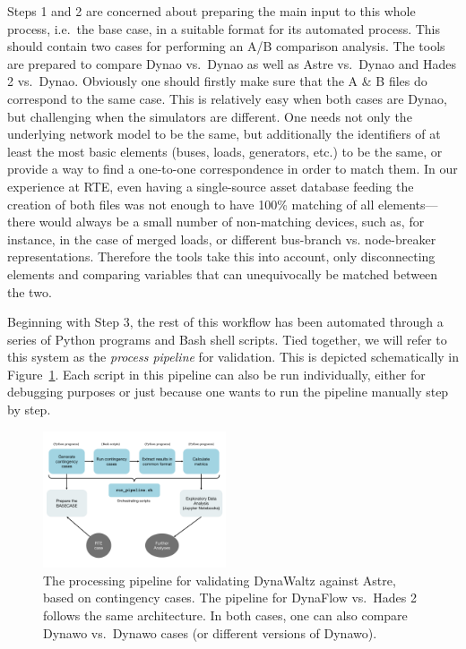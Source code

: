 \documentclass[conference]{IEEEtran}
\newcommand{\Dynawo}{Dyna\textomega o\xspace} %
\begin{document}
Steps 1 and 2 are concerned about preparing the main input to this
whole process, i.e.~the base case, in a suitable format for its
automated process. This should contain two cases for performing an A/B
comparison analysis. The tools are prepared to compare \Dynawo
vs.\ \Dynawo as well as Astre vs.\ \Dynawo and Hades 2
vs.\ \Dynawo. Obviously one should firstly make sure that the A \& B
files do correspond to the same case. This is relatively easy when
both cases are \Dynawo, but challenging when the simulators are
different.  One needs not only the underlying network model to be the
same, but additionally the identifiers of at least the most basic
elements (buses, loads, generators, etc.) to be the same, or provide a
way to find a one-to-one correspondence in order to match them.  In
our experience at RTE, even having a single-source asset database
feeding the creation of both files was not enough to have 100\%
matching of all elements---there would always be a small number of
non-matching devices, such as, for instance, in the case of merged
loads, or different bus-branch vs. node-breaker
representations. Therefore the tools take this into account, only
disconnecting elements and comparing variables that can unequivocally
be matched between the two.

Beginning with Step 3, the rest of this workflow has been automated
through a series of Python programs and Bash shell scripts. Tied
together, we will refer to this system as the \emph{process pipeline}
for validation. This is depicted schematically in
Figure~\ref{fig:pipeline1}. Each script in this pipeline can also be
run individually, either for debugging purposes or just because one
wants to run the pipeline manually step by step.

\begin{figure}
  \centering
  \includegraphics[width=0.48\textwidth]{figs/pipeline}
  \caption{The processing pipeline for validating DynaWaltz against
    Astre, based on contingency cases. The pipeline for DynaFlow
    vs.~Hades 2 follows the same architecture. In both cases, one can
    also compare Dynawo vs.~Dynawo cases (or different versions of
    Dynawo).}
  \label{fig:pipeline1}
\end{figure}
\end{document}

